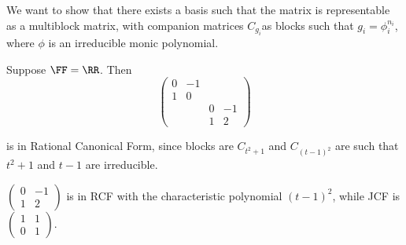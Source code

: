\documentclass[11pt]{scrartcl}
\begin{document}
We want to show that there exists a basis such that the matrix is
representable as a multiblock matrix, with companion matrices
$C_{g_i}$as blocks such that $g_i = \phi_i^{n_i}$, where $\phi$ is an irreducible monic polynomial.
\begin{example}

Suppose $\FF = \RR$. Then 
\begin{equation*}
\begin{pmatrix}
0 & -1 & & \\
1 & 0 & & \\
& & 0 & -1\\
& & 1 & 2
\end{pmatrix}
\end{equation*}

is in Rational Canonical Form, since blocks are $C_{t^2+1}$ and $C_{(t-1)^2}$ are such that $t^2+1$ and $t-1$ are irreducible.
\end{example}
\begin{remark}
$
\begin{pmatrix}
0 & -1 \\
1 & 2
\end{pmatrix}
$ is in RCF with the characteristic polynomial $(t-1)^2$, while JCF is $
\begin{pmatrix}
1 & 1 \\
0 & 1
\end{pmatrix}
$.
\end{remark}
\end{document}
